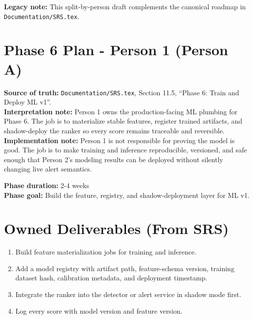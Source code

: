 \documentclass{article}
\begin{document}
\textbf{Legacy note:} This split-by-person draft complements the canonical roadmap in \texttt{Documentation/SRS.tex}.\\

\section*{Phase 6 Plan - Person 1 (Person A)}

\textbf{Source of truth:} \texttt{Documentation/SRS.tex}, Section 11.5, ``Phase 6: Train and Deploy ML v1''.\\
\textbf{Interpretation note:} Person 1 owns the production-facing ML plumbing for Phase 6. The job is to materialize stable features, register trained artifacts, and shadow-deploy the ranker so every score remains traceable and reversible.\\
\textbf{Implementation note:} Person 1 is not responsible for proving the model is good. The job is to make training and inference reproducible, versioned, and safe enough that Person 2's modeling results can be deployed without silently changing live alert semantics.

\textbf{Phase duration:} 2-4 weeks\\
\textbf{Phase goal:} Build the feature, registry, and shadow-deployment layer for ML v1.

\section*{Owned Deliverables (From SRS)}
\begin{enumerate}
\item Build feature materialization jobs for training and inference.
\item Add a model registry with artifact path, feature-schema version, training dataset hash, calibration metadata, and deployment timestamp.
\item Integrate the ranker into the detector or alert service in shadow mode first.
\item Log every score with model version and feature version.
\end{enumerate}
\end{document}
